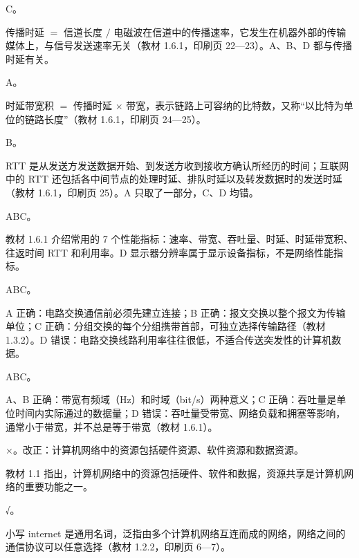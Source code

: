 \documentclass[a4paper,11pt]{article}
\begin{document}
\q C。\begin{analysis}传播时延 $=$ 信道长度 $/$ 电磁波在信道中的传播速率，它发生在机器外部的传输媒体上，与信号发送速率无关（教材 1.6.1，印刷页 22—23）。A、B、D 都与传播时延有关。\end{analysis}

\q A。\begin{analysis}时延带宽积 $=$ 传播时延 $\times$ 带宽，表示链路上可容纳的比特数，又称“以比特为单位的链路长度”（教材 1.6.1，印刷页 24—25）。\end{analysis}

\q B。\begin{analysis}RTT 是从发送方发送数据开始、到发送方收到接收方确认所经历的时间；互联网中的 RTT 还包括各中间节点的处理时延、排队时延以及转发数据时的发送时延（教材 1.6.1，印刷页 25）。A 只取了一部分，C、D 均错。\end{analysis}


\q ABC。\begin{analysis}教材 1.6.1 介绍常用的 7 个性能指标：速率、带宽、吞吐量、时延、时延带宽积、往返时间 RTT 和利用率。D 显示器分辨率属于显示设备指标，不是网络性能指标。\end{analysis}

\q ABC。\begin{analysis}A 正确：电路交换通信前必须先建立连接；B 正确：报文交换以整个报文为传输单位；C 正确：分组交换的每个分组携带首部，可独立选择传输路径（教材 1.3.2）。D 错误：电路交换线路利用率往往很低，不适合传送突发性的计算机数据。\end{analysis}

\q ABC。\begin{analysis}A、B 正确：带宽有频域（Hz）和时域（bit/s）两种意义；C 正确：吞吐量是单位时间内实际通过的数据量；D 错误：吞吐量受带宽、网络负载和拥塞等影响，通常小于带宽，并不总是等于带宽（教材 1.6.1）。\end{analysis}


\q ×。改正：计算机网络中的资源包括硬件资源、软件资源和数据资源。\begin{analysis}教材 1.1 指出，计算机网络中的资源包括硬件、软件和数据，资源共享是计算机网络的重要功能之一。\end{analysis}

\q √。\begin{analysis}小写 internet 是通用名词，泛指由多个计算机网络互连而成的网络，网络之间的通信协议可以任意选择（教材 1.2.2，印刷页 6—7）。\end{analysis}
\end{document}

